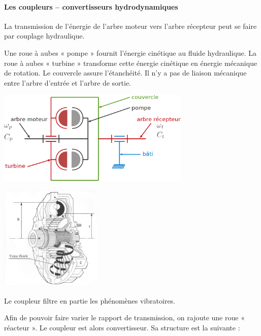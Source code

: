 \documentclass[11pt,oneside]{article}
\begin{document}
\paragraph{Les coupleurs -- convertisseurs hydrodynamiques}

La transmission de l’énergie de l’arbre moteur vers l’arbre récepteur peut se faire par couplage hydraulique. 

Une roue à aubes « pompe » fournit l’énergie cinétique au fluide hydraulique. La roue à aubes « turbine » transforme cette énergie cinétique en énergie mécanique de rotation. Le couvercle assure l’étanchéité.
Il n’y a pas de liaison mécanique entre l’arbre d’entrée et l’arbre de sortie.

\begin{minipage}[c]{.45\linewidth}
\begin{center}
\includegraphics[height=4.5cm]{png/fig_25}
\end{center}
\end{minipage} \hfill
\begin{minipage}[c]{.45\linewidth}
\begin{center}
\includegraphics[height=5cm]{png/fig_26}
\end{center}
\end{minipage}

Le coupleur filtre en partie les phénomènes vibratoires.

Afin de pouvoir faire varier le rapport de transmission, on rajoute une roue « réacteur ». Le coupleur est alors convertisseur. Sa structure est la suivante :
\end{document}
